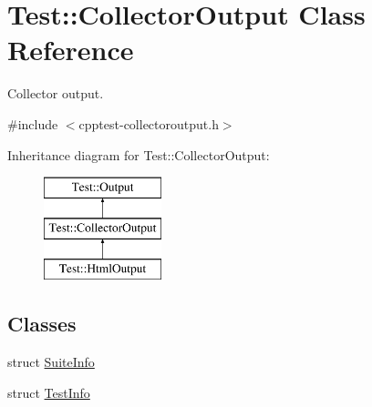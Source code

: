 \hypertarget{class_test_1_1_collector_output}{}\section{Test\+:\+:Collector\+Output Class Reference}
\label{class_test_1_1_collector_output}


Collector output.  




{\ttfamily \#include $<$cpptest-\/collectoroutput.\+h$>$}

Inheritance diagram for Test\+:\+:Collector\+Output\+:\begin{figure}[H]
\begin{center}
\leavevmode
\includegraphics[height=3.000000cm]{class_test_1_1_collector_output}
\end{center}
\end{figure}
\subsection*{Classes}
\begin{DoxyCompactItemize}
\item 
struct \hyperlink{struct_test_1_1_collector_output_1_1_suite_info}{Suite\+Info}
\item 
struct \hyperlink{struct_test_1_1_collector_output_1_1_test_info}{Test\+Info}
\end{DoxyCompactItemize}
